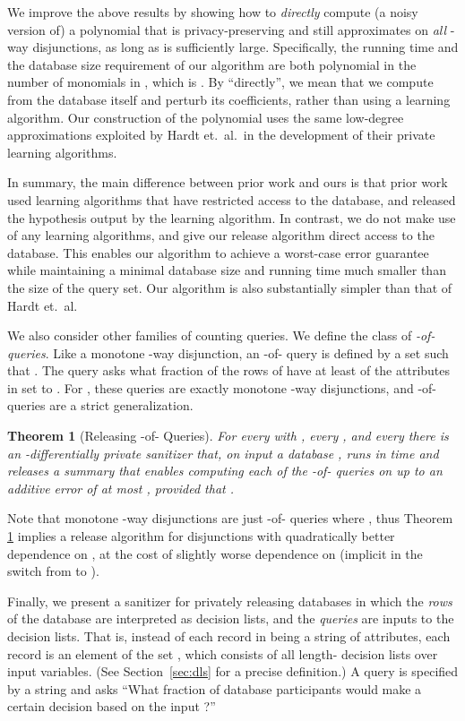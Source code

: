 \documentclass[11pt]{article}
\newtheorem{theorem}{Theorem}[section]
\theoremstyle{definition}
\begin{document}
We improve the above results by showing how to \emph{directly} compute (a noisy version of) a polynomial  that is privacy-preserving and still approximates  on \emph{all} -way disjunctions, as long as  is sufficiently large. Specifically, the running time and the database size requirement of our algorithm are both polynomial in the number of monomials in , which is .  By ``directly'', we mean that we compute  from the database  itself and perturb its coefficients, rather than using a learning algorithm. Our construction of the polynomial  uses the same low-degree approximations exploited by Hardt et.~al.~in the development
of their private learning algorithms. 





In summary, the main difference between prior work and ours is that prior work used learning algorithms that have restricted access to the database, and released the hypothesis
output by the learning algorithm. In contrast, we do not make use of any learning algorithms, and give our release algorithm direct access to the database. This enables our algorithm to achieve a worst-case error guarantee while maintaining a minimal database size and running time much smaller than the size of the query set.  Our algorithm is also substantially simpler than that of Hardt et.~al.



We also consider other families of counting queries.  We define the class of \emph{-of- queries}.  Like a monotone -way disjunction, an -of- query is defined by a set  such that .  The query asks what fraction of the rows of  have at least  of the attributes in  set to .  For , these queries are exactly monotone -way disjunctions, and -of- queries are a strict generalization.

\begin{theorem}[Releasing -of- Queries] \label{thm:main2}
For every  with , every , and every  there is an -differentially private sanitizer that, on input a database , runs in time  and releases a summary that enables computing each of the -of- queries on  up to an additive error of at most , provided that .
\end{theorem}
Note that monotone -way disjunctions are just -of- queries where , thus Theorem \ref{thm:main2} 
implies a release algorithm for disjunctions with
quadratically better dependence on , at the cost of slightly worse dependence on  (implicit in the switch from  to ).

Finally, we present a sanitizer for privately releasing databases in which
the \emph{rows} of the database are interpreted as decision lists, and the \emph{queries} are inputs to the
decision lists. That is, instead of each record in  being a string of  attributes, each record is an element of the set , which consists of all length- decision lists over  input variables. (See Section~\ref{sec:dls} for a precise definition.) A query is specified by a string  and asks ``What fraction of database participants would make a certain decision based on the input ?''
\end{document}
